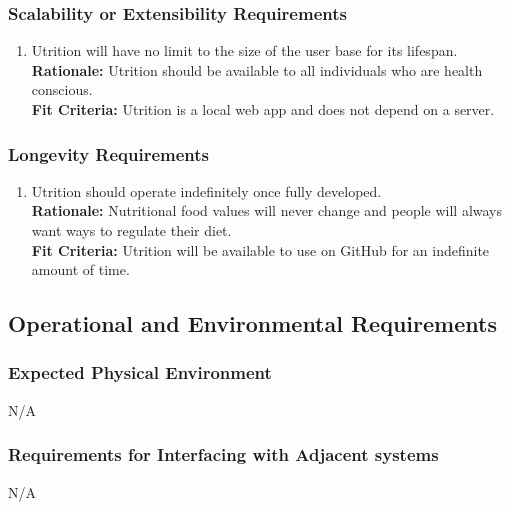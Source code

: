 \documentclass[12pt]{article}
\begin{document}
\subsubsection{Scalability or Extensibility Requirements}

\begin{enumerate}[{PR}4. ] 
	\item Utrition will have no limit to the size of the user base for its lifespan. \\
	\textbf{Rationale:} Utrition should be available to all individuals who are health conscious.\\
	\textbf{Fit Criteria:} Utrition is a local web app and does not depend on a server.
\end{enumerate}

\subsubsection{Longevity Requirements}

\begin{enumerate}[{PR}5. ] 
	\item Utrition should operate indefinitely once fully developed.\\
	\textbf{Rationale:} Nutritional food values will never change and people will always want ways to regulate their diet. \\
	\textbf{Fit Criteria:} Utrition will be available to use on GitHub for an indefinite amount of time.
\end{enumerate}

\subsection{Operational and Environmental Requirements}

\subsubsection{Expected Physical Environment}
\hspace{1.5cm}N/A

\subsubsection{Requirements for Interfacing with Adjacent systems}
\hspace{1.5cm}N/A 
\end{document}
